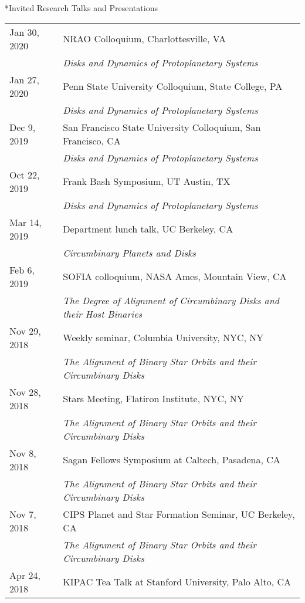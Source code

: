 \documentclass[10pt]{article}
\makeatletter
\newcommand{\rowskip}{1.2mm}
\renewcommand{\section}{\@startsection{section}{1}{0pt}{-\baselineskip}{0.5\baselineskip}{\scshape\color{myblue1}}}
\makeatother
\begin{document}
\section*{Invited Research Talks and Presentations}
\begin{tabular*}{\textwidth}{@{\hspace{10pt}}p{1.2in}l}
  Jan 30, 2020 & NRAO Colloquium, Charlottesville, VA \\
  & \emph{Disks and Dynamics of Protoplanetary Systems} \\[\rowskip]
  Jan 27, 2020 & Penn State University Colloquium, State College, PA \\
  & \emph{Disks and Dynamics of Protoplanetary Systems} \\[\rowskip]
  Dec 9, 2019 & San Francisco State University Colloquium, San Francisco, CA \\
  & \emph{Disks and Dynamics of Protoplanetary Systems} \\[\rowskip]
  Oct 22, 2019 & Frank Bash Symposium, UT Austin, TX \\
  & \emph{Disks and Dynamics of Protoplanetary Systems} \\[\rowskip]
  Mar 14, 2019 & Department lunch talk, UC Berkeley, CA \\
  & \emph{Circumbinary Planets and Disks} \\[\rowskip]
  Feb 6, 2019 & SOFIA colloquium, NASA Ames, Mountain View, CA \\
  & \emph{The Degree of Alignment of Circumbinary Disks and their Host Binaries} \\[\rowskip]
  Nov 29, 2018 & Weekly seminar, Columbia University, NYC, NY \\
  & \emph{The Alignment of Binary Star Orbits and their Circumbinary Disks} \\[\rowskip]
  Nov 28, 2018 & Stars Meeting, Flatiron Institute, NYC, NY \\
  & \emph{The Alignment of Binary Star Orbits and their Circumbinary Disks} \\[\rowskip]
  Nov 8, 2018 & Sagan Fellows Symposium at Caltech, Pasadena, CA \\
  & \emph{The Alignment of Binary Star Orbits and their Circumbinary Disks} \\[\rowskip]
  Nov 7, 2018 & CIPS Planet and Star Formation Seminar, UC Berkeley, CA  \\
  & \emph{The Alignment of Binary Star Orbits and their Circumbinary Disks} \\[\rowskip]
  Apr 24, 2018 & KIPAC Tea Talk at Stanford University, Palo Alto, CA \\

\end{tabular*}
\end{document}

